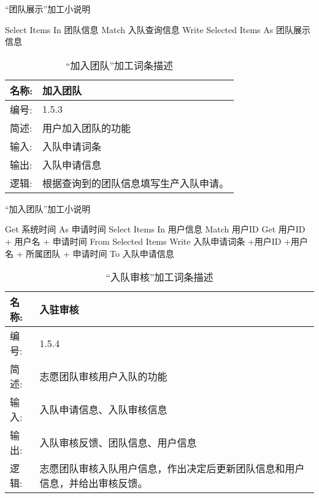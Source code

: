 \begin{algorithm}[H] 
    \renewcommand{\thealgorithm}{}
    \caption{“团队展示”加工小说明} 
    \label{alg3} 
    \begin{algorithmic}[1]
        \STATE Select Items In 团队信息 Match 入队查询信息
        \STATE Write Selected Items As 团队展示信息
    \end{algorithmic} 
\end{algorithm}


\begin{table}[H]  
\caption{“加入团队”加工词条描述}  
\begin{center}  
    \begin{tabular}{l p{11cm}} 
        \hline
        \quad 名称:  &   加入团队 \\
        \hline
        \quad 编号:  & 1.5.3 \\
        \hline
        \quad 简述:  & 用户加入团队的功能 \\
        \hline
        \quad 输入:  & 入队申请词条 \\
        \hline
        \quad 输出:  & 入队申请信息 \\
        \hline
        \quad 逻辑:  & 根据查询到的团队信息填写生产入队申请。 \\
        \hline
    \end{tabular}
    \label{tab1}
\end{center}
\end{table}

\begin{algorithm}[H]
    \renewcommand{\thealgorithm}{}
    \caption{“加入团队”加工小说明} 
    \label{alg3} 
    \begin{algorithmic}[1]
        \STATE Get 系统时间 As 申请时间
        \STATE Select Items In 用户信息 Match 用户ID
        \STATE Get 用户ID + 用户名 + 申请时间 From Selected Items
        \STATE Write 入队申请词条 +用户ID +用户名 + 所属团队 + 申请时间 To 入队申请信息
    \end{algorithmic} 
\end{algorithm}


\begin{table}[H]  
\caption{“入队审核”加工词条描述}  
\begin{center}  
    \begin{tabular}{l p{11cm}} 
        \hline
        \quad 名称:  &   入驻审核 \\
        \hline
        \quad 编号:  & 1.5.4 \\
        \hline
        \quad 简述:  & 志愿团队审核用户入队的功能 \\
        \hline
        \quad 输入:  & 入队申请信息、入队审核信息 \\
        \hline
        \quad 输出:  & 入队审核反馈、团队信息、用户信息 \\
        \hline
        \quad 逻辑:  & 志愿团队审核入队用户信息，作出决定后更新团队信息和用户信息，并给出审核反馈。 \\
        \hline
    \end{tabular}
    \label{tab1}
\end{center}
\end{table}

